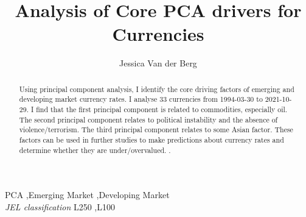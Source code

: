 \documentclass[11pt,preprint, authoryear]{elsarticle}
\numberwithin{equation}{section}
\numberwithin{figure}{section}
\numberwithin{table}{section}
\begin{document}
\begin{frontmatter}  %

\title{Analysis of Core PCA drivers for Currencies}





\author[Add1]{Jessica Van der Berg}





\address[Add1]{Stellenbosch Univeristy, South Africa}


\begin{abstract}
\small{
Using principal component analysis, I identify the core driving factors
of emerging and developing market currency rates. I analyse 33
currencies from 1994-03-30 to 2021-10-29. I find that the first
principal component is related to commodities, especially oil. The
second principal component relates to political instability and the
absence of violence/terrorism. The third principal component relates to
some Asian factor. These factors can be used in further studies to make
predictions about currency rates and determine whether they are
under/overvalued. .
}
\end{abstract}

\vspace{1cm}


\begin{keyword}
\footnotesize{
PCA \sep Emerging Market \sep Developing Market \\
\vspace{0.3cm}
}
\footnotesize{
\textit{JEL classification} L250 \sep L100
}
\end{keyword}



\vspace{0.5cm}

\end{frontmatter}



\pagestyle{fancy}
\chead{}
\lfoot{}
\lhead{}
\cfoot{}

\end{document}
